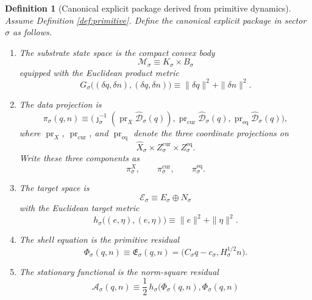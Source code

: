 \documentclass[11pt]{article}
\newcommand{\SubSpace}[1]{\mathcal M_{#1}}
\newcommand{\SubMetric}[1]{G_{#1}}
\newcommand{\DataProj}[1]{\pi_{#1}}
\newcommand{\SubVisible}[1]{\pi_{#1}^{X}}
\newcommand{\SubCurrent}[1]{\pi_{#1}^{\mathrm{cur}}}
\newcommand{\SubEq}[1]{\pi_{#1}^{\mathrm{eq}}}
\newcommand{\SubTarget}[1]{\mathcal E_{#1}}
\newcommand{\SubTargetMetric}[1]{h_{#1}}
\newcommand{\ShellEquation}[1]{\Phi_{#1}}
\newcommand{\StationaryFunctional}[1]{\mathscr A_{#1}}
\newcommand{\VisibleAffine}[1]{\widehat X_{#1}}
\newcommand{\CoordBody}[1]{K_{#1}}
\newcommand{\NormalSpace}[1]{N_{#1}}
\newcommand{\NormalBody}[1]{B_{#1}}
\newcommand{\AffineData}[1]{\widehat{\mathcal D}_{#1}}
\newcommand{\ConstraintMap}[1]{C_{#1}}
\newcommand{\ConstraintValue}[1]{c_{#1}}
\newcommand{\NormalOperator}[1]{H_{#1}}
\newcommand{\DynamicResidual}[1]{\mathfrak E_{#1}}
\newtheorem{definition}{Definition}
\begin{document}
\begin{definition}[Canonical explicit package derived from primitive dynamics]
\label{def:canonical}
Assume Definition \ref{def:primitive}. Define the canonical explicit package in sector \(\sigma\) as follows.
\begin{enumerate}
    \item The substrate state space is the compact convex body
    \[
    \SubSpace{\sigma}
    \equiv
    \CoordBody{\sigma}\times\NormalBody{\sigma}
    \]
    equipped with the Euclidean product metric
    \[
    \SubMetric{\sigma}\bigl((\delta q,\delta n),(\delta q,\delta n)\bigr)
    \equiv
    \|\delta q\|^{2}+\|\delta n\|^{2}.
    \]
    \item The data projection is
    \begin{equation}
    \DataProj{\sigma}(q,n)
    \equiv
    \bigl(
    \jmath_{\sigma}^{-1}(\operatorname{pr}_{X}\AffineData{\sigma}(q)),
    \operatorname{pr}_{\mathrm{cur}}\AffineData{\sigma}(q),
    \operatorname{pr}_{\mathrm{eq}}\AffineData{\sigma}(q)
    \bigr),
    \label{eq:canonicalpi}
    \end{equation}
    where \(\operatorname{pr}_{X}\), \(\operatorname{pr}_{\mathrm{cur}}\), and \(\operatorname{pr}_{\mathrm{eq}}\) denote the three coordinate projections on
    \[
    \VisibleAffine{\sigma}\times Z_{\sigma}^{\mathrm{cur}}\times Z_{\sigma}^{\mathrm{eq}}.
    \]
    Write these three components as
    \[
    \SubVisible{\sigma},\qquad
    \SubCurrent{\sigma},\qquad
    \SubEq{\sigma}.
    \]
    \item The target space is
    \[
    \SubTarget{\sigma}\equiv E_{\sigma}\oplus\NormalSpace{\sigma}
    \]
    with the Euclidean target metric
    \[
    \SubTargetMetric{\sigma}\bigl((e,\eta),(e,\eta)\bigr)
    \equiv
    \|e\|^{2}+\|\eta\|^{2}.
    \]
    \item The shell equation is the primitive residual
    \begin{equation}
    \ShellEquation{\sigma}(q,n)
    \equiv
    \DynamicResidual{\sigma}(q,n)
    =
    \bigl(
    \ConstraintMap{\sigma}q-\ConstraintValue{\sigma},
    \NormalOperator{\sigma}^{1/2}n
    \bigr).
    \label{eq:canonicalphi}
    \end{equation}
    \item The stationary functional is the norm-square residual
    \begin{equation}
    \StationaryFunctional{\sigma}(q,n)
    \equiv
    \frac12\,
    \SubTargetMetric{\sigma}
    \bigl(
    \ShellEquation{\sigma}(q,n),
    \ShellEquation{\sigma}(q,n)

\end{equation}
\end{enumerate}
\end{definition}
\end{document}
